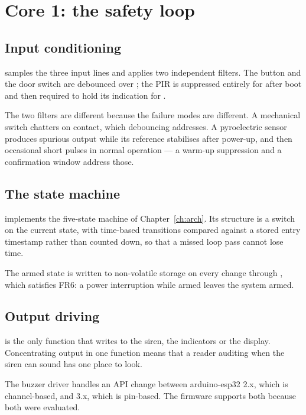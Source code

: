 \section{Core 1: the safety loop}

\subsection{Input conditioning}

 samples the three input lines and applies two independent filters. The
button and the door switch are debounced over ; the PIR is suppressed
entirely for  after boot and then required to hold its indication for
.

The two filters are different because the failure modes are different. A mechanical switch
chatters on contact, which debouncing addresses. A pyroelectric sensor produces spurious output
while its reference stabilises after power-up, and then occasional short pulses in normal
operation — a warm-up suppression and a confirmation window address those.

\subsection{The state machine}

 implements the five-state machine of Chapter~\ref{ch:arch}. Its structure is a
switch on the current state, with time-based transitions compared against a stored entry
timestamp rather than counted down, so that a missed loop pass cannot lose time.

The armed state is written to non-volatile storage on every change through
, which satisfies FR6: a power interruption while armed leaves the system
armed.

\subsection{Output driving}

 is the only function that writes to the siren, the indicators or the
display. Concentrating output in one function means that a reader auditing when the siren can
sound has one place to look.

The buzzer driver handles an API change between arduino-esp32 2.x, which is channel-based, and
3.x, which is pin-based. The firmware supports both because both were evaluated.


